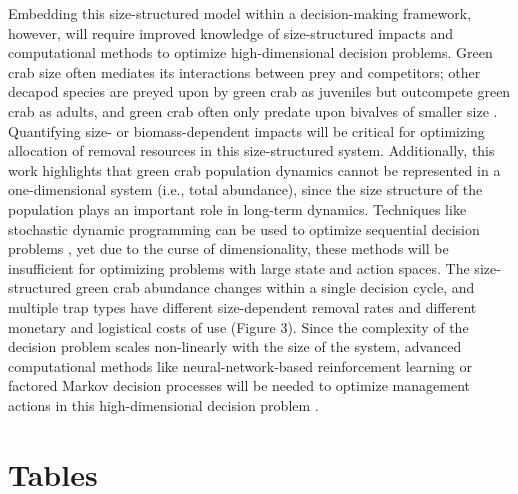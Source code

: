 \documentclass{article}
\begin{document}
Embedding this size-structured model within a decision-making framework, however, will require improved knowledge of size-structured impacts and computational methods to optimize high-dimensional decision problems. Green crab size often mediates its interactions between prey and competitors; other decapod species are preyed upon by green crab as juveniles but outcompete green crab as adults, and green crab often only predate upon bivalves of smaller size \parencite{grosholz2005recent, williams2009competition, mcdonald2001competitive, curtis2012prey}. Quantifying size- or biomass-dependent impacts will be critical for optimizing allocation of removal resources in this size-structured system. Additionally, this work highlights that green crab population dynamics cannot be represented in a one-dimensional system (i.e., total abundance), since the size structure of the population plays an important role in long-term dynamics. Techniques like stochastic dynamic programming can be used to optimize sequential decision problems \parencite{marescot2013complex}, yet due to the curse of dimensionality, these methods will be insufficient for optimizing problems with large state and action spaces. The size-structured green crab abundance changes within a single decision cycle, and multiple trap types have different size-dependent removal rates and different monetary and logistical costs of use (Figure 3). Since the complexity of the decision problem scales non-linearly with the size of the system, advanced computational methods like neural-network-based reinforcement learning or factored Markov decision processes will be needed to optimize management actions in this high-dimensional decision problem \parencite{lapeyrolerie2022deep, nicol2015adapting}. 


\newpage

\section{Tables}

\renewcommand{\arraystretch}{1.25}
\end{document}

